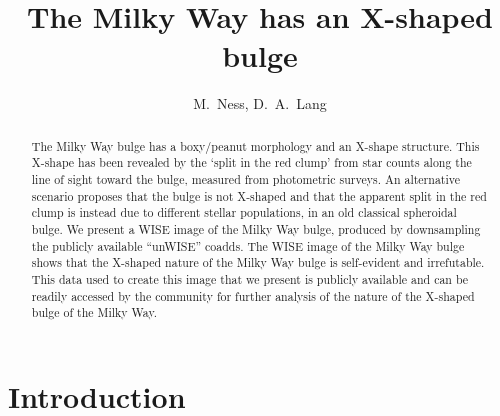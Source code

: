 \documentclass[12pt, preprint]{aastex}
\begin{document}
\title{The Milky Way has an X-shaped bulge} 
\author{%
M.~Ness,
D.~A.~Lang
}
%

\begin{abstract}%
The Milky Way bulge has a boxy/peanut morphology and an X-shape structure. This X-shape has been revealed by the `split in the red clump' from 
star counts along the line of sight toward the bulge, measured from photometric surveys. An alternative scenario proposes that the bulge is not X-shaped and that the apparent split in the red clump is instead due to different stellar populations, in an old classical spheroidal bulge. We present a WISE image of the Milky Way bulge, produced by downsampling the publicly available ``unWISE'' coadds.  The WISE image of the Milky Way bulge shows that the X-shaped nature of the Milky Way bulge is self-evident and irrefutable. This data used to create this image that we present is publicly available and can be readily accessed by the community for further analysis of the nature of the X-shaped bulge of the Milky Way. 
\end{abstract}

\keywords{%
}

\section{Introduction}\label{sec:Intro}
\end{document}
